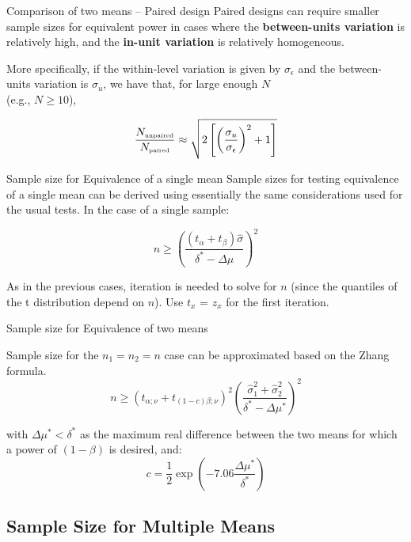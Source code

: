 \begin{frame}{Comparison of two means -- Paired design}
Paired designs can require smaller sample sizes for equivalent power in cases where the {\bf between-units variation} is relatively high, and the {\bf in-unit variation} is relatively homogeneous.\bigskip

More specifically, if the within-level variation is given by $\sigma_\epsilon$ and the between-units variation is $\sigma_u$, we have that, for large enough $N$\\(e.g., $N\geq 10$),

\begin{equation*}
\frac{N_{\mbox{\tiny unpaired}}}{N_{\mbox{\tiny paired}}}\approx\sqrt{2\left[\left(\frac{\sigma_u}{\sigma_\epsilon}\right)^2+1\right]}
\end{equation*}
\end{frame}


\begin{frame}{Sample size for Equivalence of a single mean}
Sample sizes for testing equivalence of a single mean can be derived using essentially the same considerations used for the usual tests. In the case of a single sample:

\begin{equation*}
n\geq\left(\frac{\left(t_{\alpha}+t_{\beta}\right)\hat{\sigma}}{\delta^* - \Delta\mu}\right)^2
\end{equation*}
\bigskip

As in the previous cases, iteration is needed to solve for $n$ (since the quantiles of the t distribution depend on $n$). Use $t_x$ = $z_x$ for the first iteration.
\end{frame}

\begin{frame}
{Sample size for Equivalence of two means}

Sample size for the $n_1 = n_2 = n$ case can be approximated based on the Zhang formula.
$$n \geq \left(t_{\alpha;\nu}+t_{(1-c)\beta;\nu}\right)^2\left(\frac{\hat{\sigma}_1^2+\hat{\sigma}_2^2}{\delta^*-\Delta\mu^*}\right)^2$$

\noindent with $\Delta\mu^*<\delta^*$ as the maximum real difference between the two means for which a power of $(1-\beta)$ is desired, and:
$$c = \frac{1}{2}\exp\left(-7.06\frac{\Delta\mu^*}{\delta^*}\right)$$
\end{frame}

\subsection{Sample Size for Multiple Means}


